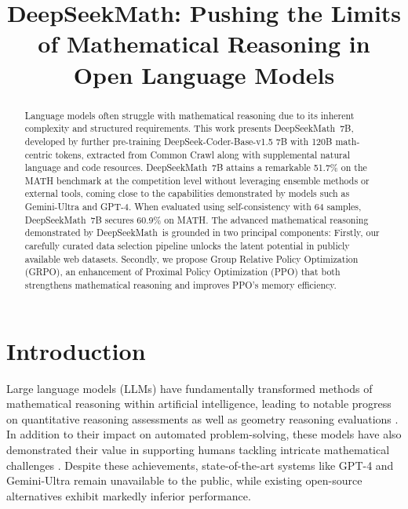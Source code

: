 \title{DeepSeekMath: Pushing the Limits of Mathematical Reasoning in Open Language Models}

\begin{abstract}
Language models often struggle with mathematical reasoning due to its inherent complexity and structured requirements. This work presents DeepSeekMath~7B, developed by further pre-training DeepSeek-Coder-Base-v1.5 7B with 120B math-centric tokens, extracted from Common Crawl along with supplemental natural language and code resources. DeepSeekMath~7B attains a remarkable 51.7\% on the MATH benchmark at the competition level without leveraging ensemble methods or external tools, coming close to the capabilities demonstrated by models such as Gemini-Ultra and GPT-4. When evaluated using self-consistency with 64 samples, DeepSeekMath~7B secures 60.9\% on MATH. The advanced mathematical reasoning demonstrated by DeepSeekMath~is grounded in two principal components: Firstly, our carefully curated data selection pipeline unlocks the latent potential in publicly available web datasets. Secondly, we propose Group Relative Policy Optimization (GRPO), an enhancement of Proximal Policy Optimization (PPO) that both strengthens mathematical reasoning and improves PPO's memory efficiency.
\end{abstract}

\section{Introduction}

Large language models (LLMs) have fundamentally transformed methods of mathematical reasoning within artificial intelligence, leading to notable progress on quantitative reasoning assessments \citep{MATH} as well as geometry reasoning evaluations \citep{trinh2024solving}. In addition to their impact on automated problem-solving, these models have also demonstrated their value in supporting humans tackling intricate mathematical challenges \citep{tao}. Despite these achievements, state-of-the-art systems like GPT-4 \citep{gpt4} and Gemini-Ultra \citep{gemini} remain unavailable to the public, while existing open-source alternatives exhibit markedly inferior performance.

